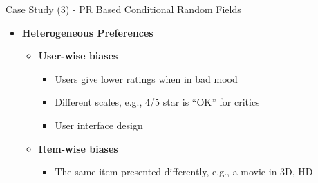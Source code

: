 \documentclass[
 size=14pt,
 paper=smartboard,  %
 mode=present, 		%
 display=slides, 	%
 style=tuliplab,  	%
 pauseslide,
 fleqn,leqno]{powerdot}{}
\begin{document}
\begin{slide}[toc=,bm=]{Case Study (3) - PR Based Conditional Random Fields}
	
	
	\begin{itemize}
		\item  \textbf{Heterogeneous Preferences}
		
		\begin{itemize}
			\item \textbf{User-wise biases}
			\begin{itemize}
				\item Users give lower ratings when in bad mood
				
				\item Different scales, e.g., 4/5 star is ``OK'' for critics
				
				\item User interface design
				
			\end{itemize}
			
			\item \textbf{Item-wise biases}
			
			\begin{itemize}
				
				\item The same item presented differently,
				e.g., a movie in 3D, HD
				
			\end{itemize}
		\end{itemize}
	\end{itemize}

	
	
\end{slide}
\end{document}
